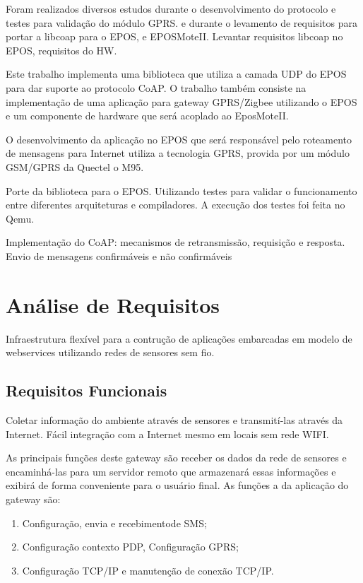 Foram realizados diversos estudos durante o desenvolvimento do protocolo e testes para valida\c{c}\~ao do m\'odulo GPRS. e durante o levamento de requisitos para portar a libcoap para o EPOS, e EPOSMoteII. Levantar requisitos libcoap no EPOS, requisitos do HW.

Este trabalho implementa uma biblioteca que utiliza a camada UDP do EPOS para dar suporte ao protocolo CoAP. O trabalho tamb\'em consiste na implementa\c{c}\~ao de uma aplica\c{c}\~ao para gateway GPRS/Zigbee utilizando o EPOS e um componente de hardware que ser\'a acoplado ao EposMoteII.

O desenvolvimento da aplica\c{c}\~ao no EPOS que ser\'a respons\'avel pelo roteamento de mensagens para Internet utiliza a tecnologia GPRS, provida por um m\'odulo GSM/GPRS da Quectel o M95.

Porte da biblioteca para o EPOS. Utilizando testes para validar o funcionamento entre diferentes arquiteturas e compiladores. A execu\c{c}\~ao dos testes foi feita no Qemu.

Implementa\c{c}\~ao do CoAP: mecanismos de retransmiss\~ao, requisi\c{c}\~ao e resposta. Envio de mensagens confirm\'aveis e n\~ao confirm\'aveis

\section{An\'alise de Requisitos}
Infraestrutura flex\'ivel para a contru\c{c}\~ao de aplica\c{c}\~oes embarcadas em modelo de webservices utilizando redes de sensores sem fio.
\subsection{Requisitos Funcionais}{
Coletar informa\c{c}\~ao do ambiente atrav\'es de sensores e transmit\'i-las atrav\'es da Internet. F\'acil integra\c{c}\~ao com a Internet mesmo em locais sem rede WIFI.

As principais fun\c{c}\~oes deste gateway s\~ao receber os dados da rede de sensores e encaminh\'a-las para um servidor remoto que armazenar\'a essas informa\c{c}\~oes e exibir\'a de forma conveniente para o usu\'ario final.
As fun\c{c}\~oes a da aplica\c{c}\~ao do gateway s\~ao:
\begin{enumerate}
    \item Configura\c{c}\~ao, envia e recebimentode SMS;
    \item Configura\c{c}\~ao contexto PDP, Configura\c{c}\~ao GPRS;
    \item Configura\c{c}\~ao TCP/IP e manuten\c{c}\~ao de conex\~ao TCP/IP.
\end{enumerate}
}

